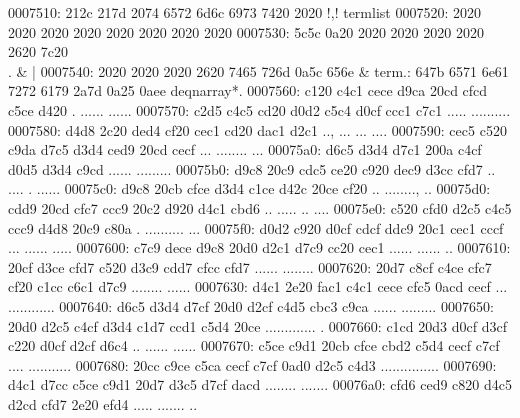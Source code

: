 \begin{bo
00010e0: 7865 647d 5c62 6567 696e 7b76 6572 6261  xed}
\begin{verba
00010f0: 7469 6d7d 0a20 2023 7479 7065 2074 6572  tim}
\begin{
0001c40: 7665 7262 6174 696d 7d0a 2020 236c 6574  verbatim}
\begin{boxe
00027a0: 647d 5c62 6567 696e 7b76 6572 6261 7469  d}
\begin{verbati
00027b0: 6d7d 0a20 2023 6c65 7420 696e 6669 7865  m}
\begin{v
0002c60: 6572 6261 7469 6d7d 0a20 2023 6c65 7420  erbatim}
\begin{
0002dc0: 7665 7262 6174 696d 7d0a 2020 236c 6574  verbatim}
\begin{boxed
0002f30: 7d5c 6265 6769 6e7b 7665 7262 6174 696d  }
\begin{verbatim
0002f40: 7d0a 2020 236c 6574 2068 6428 683a 3a74  }
\begin{v
0003e60: 6572 6261 7469 6d7d 0a20 2023 236f 7065  erbatim}
\begin{boxed
00042b0: 7d5c 6265 6769 6e7b 7665 7262 6174 696d  }
\begin{verbatim
00042c0: 7d0a 2020 2328 782c 7429 3b3b 0a20 202d  }
\begin{boxed}
{0007510: 212c 217d 2074 6572 6d6c 6973 7420 2020  !,!} termlist   
0007520: 2020 2020 2020 2020 2020 2020 2020 2020                  
0007530: 5c5c 0a20 2020 2020 2020 2020 2620 7c20  \\.         & | 
0007540: 2020 2020 2020 2620 7465 726d 0a5c 656e        & term.: 647b 6571 6e61 7272 6179 2a7d 0a25 0aee  d{eqnarray*}.%
0007560: c120 c4c1 cece d9ca 20cd cfcd c5ce d420  . ...... ...... 
0007570: c2d5 c4c5 cd20 d0d2 c5c4 d0cf ccc1 c7c1  ..... ..........
0007580: d4d8 2c20 ded4 cf20 cec1 cd20 dac1 d2c1  .., ... ... ....
0007590: cec5 c520 c9da d7c5 d3d4 ced9 20cd cecf  ... ........ ...
00075a0: d6c5 d3d4 d7c1 200a c4cf d0d5 d3d4 c9cd  ...... .........
00075b0: d9c8 20c9 cdc5 ce20 c920 dec9 d3cc cfd7  .. .... . ......
00075c0: d9c8 20cb cfce d3d4 c1ce d42c 20ce cf20  .. ........, .. 
00075d0: cdd9 20cd cfc7 ccc9 20c2 d920 d4c1 cbd6  .. ..... .. ....
00075e0: c520 cfd0 d2c5 c4c5 ccc9 d4d8 20c9 c80a  . .......... ...
00075f0: d0d2 c920 d0cf cdcf ddc9 20c1 cec1 cccf  ... ...... .....
0007600: c7c9 dece d9c8 20d0 d2c1 d7c9 cc20 cec1  ...... ...... ..
0007610: 20cf d3ce cfd7 c520 d3c9 cdd7 cfcc cfd7   ...... ........
0007620: 20d7 c8cf c4ce cfc7 cf20 c1cc c6c1 d7c9   ........ ......
0007630: d4c1 2e20 fac1 c4c1 cece cfc5 0acd cecf  ... ............
0007640: d6c5 d3d4 d7cf 20d0 d2cf c4d5 cbc3 c9ca  ...... .........
0007650: 20d0 d2c5 c4cf d3d4 c1d7 ccd1 c5d4 20ce   ............. .
0007660: c1cd 20d3 d0cf d3cf c220 d0cf d2cf d6c4  .. ...... ......
0007670: c5ce c9d1 20cb cfce cbd2 c5d4 cecf c7cf  .... ...........
0007680: 20cc c9ce c5ca cecf c7cf 0ad0 d2c5 c4d3   ...............
0007690: d4c1 d7cc c5ce c9d1 20d7 d3c5 d7cf dacd  ........ .......
00076a0: cfd6 ced9 c820 d4c5 d2cd cfd7 2e20 efd4  ..... ....... ..

\end{boxed}
\end{verbatim
00042c0: 7d0a 2020 2328 782c 7429 3b3b 0a20 202d  }
\end{boxed
00042b0: 7d5c 6265 6769 6e7b 7665 7262 6174 696d  }
\end{v
0003e60: 6572 6261 7469 6d7d 0a20 2023 236f 7065  erbatim}
\end{verbatim
0002f40: 7d0a 2020 236c 6574 2068 6428 683a 3a74  }
\end{boxed
0002f30: 7d5c 6265 6769 6e7b 7665 7262 6174 696d  }
\end{
0002dc0: 7665 7262 6174 696d 7d0a 2020 236c 6574  verbatim}
\end{v
0002c60: 6572 6261 7469 6d7d 0a20 2023 6c65 7420  erbatim}
\end{verbati
00027b0: 6d7d 0a20 2023 6c65 7420 696e 6669 7865  m}
\end{boxe
00027a0: 647d 5c62 6567 696e 7b76 6572 6261 7469  d}
\end{
0001c40: 7665 7262 6174 696d 7d0a 2020 236c 6574  verbatim}
\end{verba
00010f0: 7469 6d7d 0a20 2023 7479 7065 2074 6572  tim}
\end{bo
00010e0: 7865 647d 5c62 6567 696e 7b76 6572 6261  xed}
